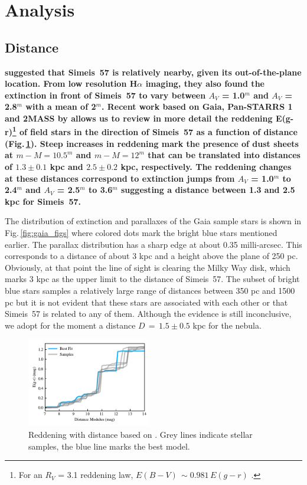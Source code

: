 \documentclass{aa}
\begin{document}
\section{Analysis}

\subsection{Distance}

{\bf \cite{israel2003} suggested that Simeis~57 is relatively nearby,
  given its out-of-the-plane location. From low resolution H$\alpha$
  imaging, they also found the extinction in front of Simeis~57 to
  vary between $A_V$ = 1.0$^{m}$ and $A_V$ = 2.8$^{m}$ with a mean of
  2$^{m}$.  Recent work based on Gaia, Pan-STARRS 1 and 2MASS by
  \cite{2019arXiv190502734G} allows us to review in more detail the
  reddening E(g-r)\footnote{For an $R_{V}$ = 3.1 reddening law,
    $E(B-V)\,\sim0.981\,E(g-r)$ \citep[see][]{Schlafly2011}.} of field
  stars in the direction of Simeis~57 as a function of distance
  (Fig.\,\ref{fig:reddening_with_D}).  Steep increases in reddening
  mark the presence of dust sheets at $m- M = 10.5^{m}$ and $m- M=
  12^{m}$ that can be translated into distances of $1.3\pm0.1$ kpc
  and $2.5\pm0.2$ kpc, respectively. The reddening changes at these
  distances correspond to extinction jumps from $A_V$ = 1.0$^{m}$ to
  2.4$^{m}$ and $A_V$ = 2.5$^{m}$ to 3.6$^{m}$ suggesting a distance
  between 1.3 and 2.5 kpc for Simeis~57.}

\par The distribution of extinction and parallaxes of the Gaia sample
stars is shown in Fig.\,\ref{fig:gaia_figs} where colored dots mark
the bright blue stars mentioned earlier.  The parallax distribution
has a sharp edge at about 0.35 milli-arcsec.  This corresponds to a
distance of about 3 kpc and a height above the plane of 250
pc. Obviously, at that point the line of sight is clearing the Milky
Way disk, which marks 3 kpc as the upper limit to the distance of
Simeis~57. The subset of bright blue stars samples a relatively large
range of distances between 350 pc and 1500 pc but it is not evident
that these stars are associated with each other or that Simeis~57 is
related to any of them.  Although the evidence is still inconclusive,
we adopt for the moment a distance $D\,=\,1.5\pm0.5$ kpc for the
nebula.


\begin{figure}
\includegraphics[width=0.48\textwidth]{Reddening_distance.pdf}
\centering
\caption{Reddening with distance based on \cite{2019arXiv190502734G}.
  Grey lines indicate stellar samples, the blue line marks the best
  model. }
\label{fig:reddening_with_D}
\end{figure}
\end{document}
